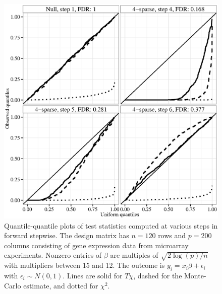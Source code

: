\documentclass[oupdraft]{bio}
\begin{document}
\begin{figure}
\begin{center}
\includegraphics[width=.9\textwidth]{nonnull_G200_high15_data.eps}
\caption{Quantile-quantile plots of test statistics computed at various steps in forward stepwise. The design matrix has $n = 120$ rows and $p = 200$ columns consisting of gene expression data from microarray experiments. Nonzero entries of $\beta$ are multiples of $\sqrt{2 \log (p)/n}$ with multipliers between 15 and 12. The outcome is $y_i = x_i\beta + \epsilon_i$ with $\epsilon_i \sim N(0,1)$. Lines are solid for $T\chi$, dashed for the Monte-Carlo estimate, and dotted for $\chi^2$.}
\label{fig:eyedata}
\end{center}
\end{figure}
\end{document}
